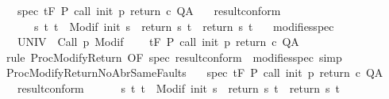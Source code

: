 \begin{isabellebody}
\ \ \ spec{\isacharcolon}\ {\isachardoublequoteopen}{\isasymGamma}{\isacharcomma}{\isasymTheta}{\isasymturnstile}\isactrlsub t\isactrlbsub {\isacharslash}F\isactrlesub \ P\ {\isacharparenleft}call\ init\ p\ return{\isacharprime}\ c{\isacharparenright}\ Q{\isacharcomma}A{\isachardoublequoteclose}\isanewline
\ \ \ result{\isacharunderscore}conform{\isacharcolon}\isanewline
\ \ \ \ \ \ {\isachardoublequoteopen}{\isasymforall}s\ t{\isachardot}\ t\ {\isasymin}\ Modif\ {\isacharparenleft}init\ s{\isacharparenright}\ {\isasymlongrightarrow}\ {\isacharparenleft}return{\isacharprime}\ s\ t{\isacharparenright}\ {\isacharequal}\ {\isacharparenleft}return\ s\ t{\isacharparenright}{\isachardoublequoteclose}\isanewline
\ \ \ modifies{\isacharunderscore}spec{\isacharcolon}\ \ \isanewline
\ \ {\isachardoublequoteopen}{\isasymforall}{\isasymsigma}{\isachardot}\ {\isasymGamma}{\isacharcomma}{\isasymTheta}{\isasymturnstile}\isactrlbsub {\isacharslash}UNIV\isactrlesub \ {\isacharbraceleft}{\isasymsigma}{\isacharbraceright}\ Call\ p\ {\isacharparenleft}Modif\ {\isasymsigma}{\isacharparenright}{\isacharcomma}{\isacharbraceleft}{\isacharbraceright}{\isachardoublequoteclose}\isanewline
\ \ \ {\isachardoublequoteopen}{\isasymGamma}{\isacharcomma}{\isasymTheta}{\isasymturnstile}\isactrlsub t\isactrlbsub {\isacharslash}F\isactrlesub \ P\ {\isacharparenleft}call\ init\ p\ return\ c{\isacharparenright}\ Q{\isacharcomma}A{\isachardoublequoteclose}\isanewline
%
\isadelimproof
%
\endisadelimproof
%
\isatagproof
{}\isamarkupfalse%
\ {\isacharparenleft}rule\ ProcModifyReturn\ {\isacharbrackleft}OF\ spec\ result{\isacharunderscore}conform\ {\isacharunderscore}\ modifies{\isacharunderscore}spec{\isacharbrackright}{\isacharparenright}\ simp%
\endisatagproof
{\isafoldproof}%
%
\isadelimproof
\isanewline
%
\endisadelimproof
\isanewline
\isanewline
{}\isamarkupfalse%
\ ProcModifyReturnNoAbrSameFaults{\isacharcolon}\isanewline
\ \ \ spec{\isacharcolon}\ {\isachardoublequoteopen}{\isasymGamma}{\isacharcomma}{\isasymTheta}{\isasymturnstile}\isactrlsub t\isactrlbsub {\isacharslash}F\isactrlesub \ P\ {\isacharparenleft}call\ init\ p\ return{\isacharprime}\ c{\isacharparenright}\ Q{\isacharcomma}A{\isachardoublequoteclose}\isanewline
\ \ \ result{\isacharunderscore}conform{\isacharcolon}\isanewline
\ \ \ \ \ \ {\isachardoublequoteopen}{\isasymforall}s\ t{\isachardot}\ t\ {\isasymin}\ Modif\ {\isacharparenleft}init\ s{\isacharparenright}\ {\isasymlongrightarrow}\ {\isacharparenleft}return{\isacharprime}\ s\ t{\isacharparenright}\ {\isacharequal}\ {\isacharparenleft}return\ s\ t{\isacharparenright}{\isachardoublequoteclose}\isanewline

\end{isabellebody}
